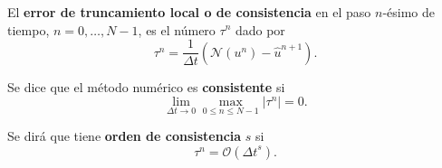 \begin{frame}
    \frametitle{\secname}

    \begin{definition}
        El \textbf{error de truncamiento local o de consistencia} en el
        paso $n$-ésimo de tiempo, $n=0,\dotsc,N-1$, es el número $\tau^{n}$
        dado por
        \begin{equation*}
            \tau^{n}=
            \frac{1}{\Delta t}
            \left(
            \mathcal{N}\left(u^{n}\right)-
            \widehat{u}^{n+1}
            \right).
        \end{equation*}
    \end{definition}

    \begin{definition}
        Se dice que el método numérico es \textbf{consistente} si
        \begin{equation*}
            \lim_{\Delta t\to0}
            \max_{0\leq n\leq N-1}
            \left|\tau^{n}\right|
            =0.
        \end{equation*}

        Se dirá que tiene \textbf{orden de consistencia} $s$ si
        \begin{equation*}
            \tau^{n}=
            \mathcal{O}
            \left({\Delta t}^{s}\right).
        \end{equation*}
    \end{definition}
\end{frame}


